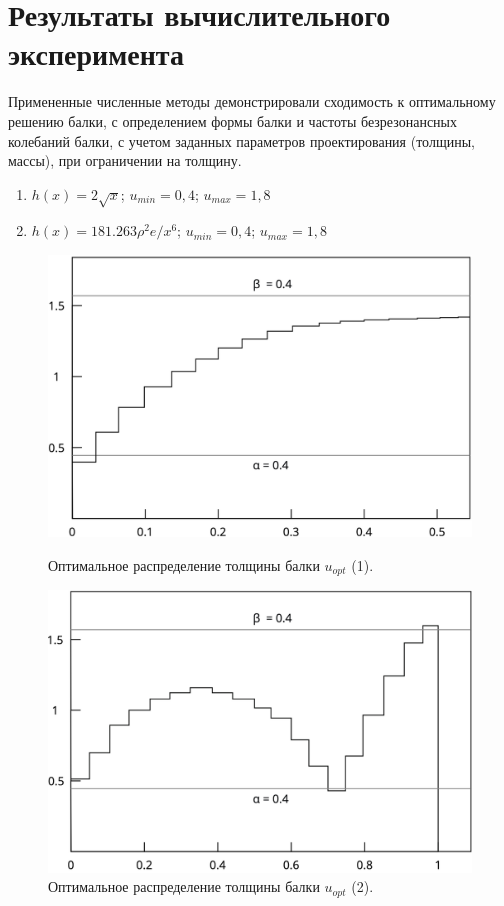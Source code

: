 \section{Результаты вычислительного эксперимента}
%
%
%
%
\par
Примененные численные методы демонстрировали сходимость к оптимальному решению балки, с определением формы балки и частоты безрезонансных колебаний балки, с учетом заданных параметров проектирования (толщины, массы), при ограничении на толщину.
%
%
%
\begin{enumerate}
	\item 	$h(x) = 2\sqrt{x}$; \;\; $u_{min} = 0{,}4$; \;\; $u_{max} = 1{,}8$
	\item 	$h(x) = 181.263 \rho^2e/x^6 $; \;\; $u_{min} = 0{,}4$; \;\; $u_{max} = 1{,}8$
\end{enumerate}

\begin{center}
	\begin{figure}
		\includegraphics[width=1\linewidth]{untitled2.png}
		\caption{Оптимальное распределение толщины балки $u_{opt}$ (1).}
		\bigskip
		\includegraphics[width=1\linewidth]{untitled.png}
		\caption{Оптимальное распределение толщины балки $u_{opt}$ (2).}
	\end{figure}
\end{center}



